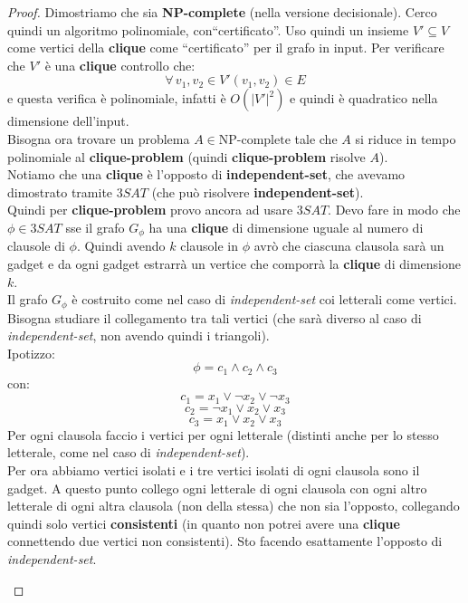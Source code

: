 \documentclass[a4paper,12pt, oneside]{book}
\begin{document}
\begin{proof}
  Dimostriamo che sia \textbf{NP-complete} (nella versione decisionale). Cerco
  quindi un algoritmo 
  polinomiale, con``certificato''. Uso quindi un insieme $V'\subseteq V$ come
  vertici della \textbf{clique} come ``certificato'' per il grafo in input. Per
  verificare che $V'$ è una \textbf{clique} controllo che:
  \[\forall\,v_1,v_2\in    V' (v_1,v_2)\in E\]
  e questa verifica è polinomiale, infatti è $O(|V'|^2)$ e
  quindi è quadratico nella dimensione dell'input.\\
  Bisogna ora trovare un problema $A\in \mbox{NP-complete}$ tale che $A$ si
  riduce in tempo polinomiale al \textbf{clique-problem} (quindi
  \textbf{clique-problem} risolve $A$).  \\
  Notiamo che una \textbf{clique} è l'opposto di \textbf{independent-set}, che
  avevamo dimostrato tramite $3SAT$ (che può risolvere
  \textbf{independent-set}).\\
  Quindi per \textbf{clique-problem} provo ancora ad usare $3SAT$. Devo fare in
  modo che $\phi\in 3SAT$ sse il grafo $G_\phi$ ha una \textbf{clique} di
  dimensione uguale al numero di clausole di $\phi$. Quindi avendo $k$ clausole
  in $\phi$ avrò che ciascuna clausola sarà un gadget e da ogni gadget estrarrà
  un vertice che comporrà la \textbf{clique} di dimensione $k$.\\
  Il grafo $G_\phi$ è costruito come nel caso di \textit{independent-set} coi
  letterali come vertici.\\
  Bisogna studiare il collegamento tra tali vertici (che sarà diverso al caso di
  \textit{independent-set}, non avendo quindi i triangoli).\\
  Ipotizzo:
  \[\phi=c_1\land c_2\land c_3\]
  con:
  \[c_1=x_1\lor \neg x_2\lor \neg x_3\]
  \[c_2=\neg x_1\lor x_2\lor x_3\]
  \[c_3=x_1\lor x_2\lor x_3\]
  Per ogni clausola faccio i vertici per ogni letterale (distinti anche per lo
  stesso letterale, come nel caso di \textit{independent-set}).\\
  Per ora abbiamo vertici isolati e i tre vertici isolati di ogni clausola sono
  il gadget. A questo punto collego ogni letterale di ogni clausola con ogni
  altro letterale di ogni altra clausola (non della stessa) che non sia
  l'opposto, collegando quindi solo vertici \textbf{consistenti} (in quanto non
  potrei avere una \textbf{clique} connettendo due vertici non consistenti). Sto
  facendo esattamente l'opposto di \textit{independent-set}. 
  \begin{figure}

\end{figure}
\end{proof}
\end{document}
